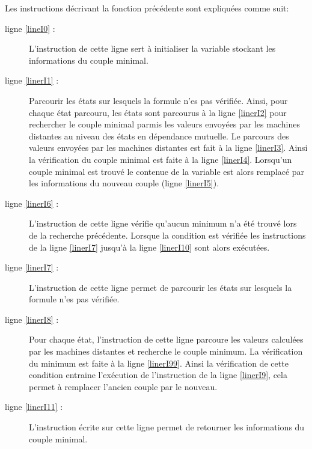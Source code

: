 Les instructions décrivant la fonction précédente sont expliquées comme suit:
\begin{description}
	\item[ligne \ref{lineI0} :] L'instruction de cette ligne sert à initialiser la variable stockant les informations du couple minimal.
	\item[ligne \ref{linerI1} :] Parcourir les états \s{\border{}} sur lesquels la formule n'es pas vérifiée. Ainsi, pour chaque état parcouru, les états \s{\notifier} sont parcourus à la ligne \ref{linerI2} pour rechercher le couple minimal parmis les valeurs envoyées par les machines distantes au niveau des états en dépendance mutuelle. Le parcours des valeurs envoyées par les machines distantes est fait à la ligne \ref{linerI3}. Ainsi la vérification du couple minimal est faite  à la ligne \ref{linerI4}. Lorsqu'un couple minimal est trouvé le contenue de la variable  est alors remplacé par les informations du nouveau couple (ligne \ref{linerI5}).
	\item[ligne \ref{linerI6} :]  L'instruction de cette ligne vérifie qu'aucun minimum n'a été trouvé lors de la recherche précédente. Lorsque la condition est vérifiée les instructions de la ligne \ref{linerI7} jusqu'à la ligne \ref{linerI10} sont alors exécutées.
	\item[ligne \ref{linerI7} :] L'instruction de cette ligne permet de parcourir les états \s{\bn{}} sur lesquels la formule n'es pas vérifiée.
	\item[ligne \ref{linerI8} :]  Pour chaque état, l'instruction de cette ligne parcoure les valeurs calculées par les machines distantes et recherche le couple minimum. La vérification du minimum est faite à la ligne \ref{linerI99}. Ainsi la vérification de cette condition entraine l'exécution de l'instruction de la ligne \ref{linerI9}, cela permet à remplacer l'ancien couple par le nouveau.
	\item[ligne \ref{linerI11} :] L'instruction écrite sur cette ligne permet de retourner les informations du couple minimal.
\end{description}

